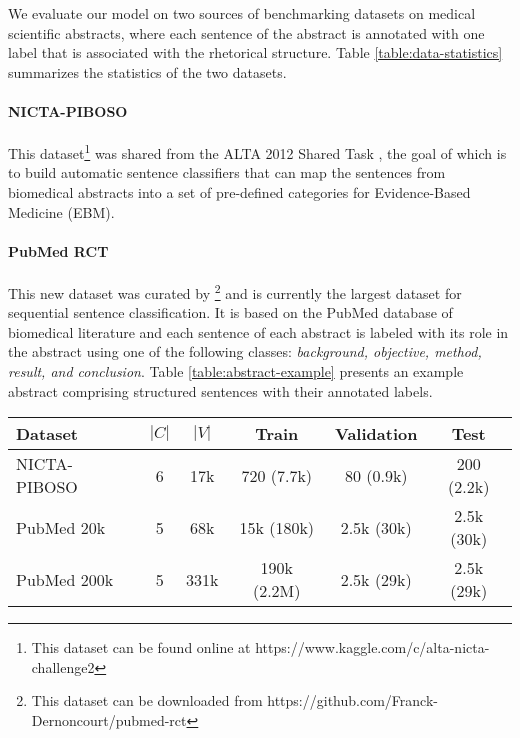 \documentclass[11pt,a4paper]{article}
\begin{document}
We evaluate our model on two sources of benchmarking datasets on medical scientific abstracts, where each sentence of the abstract is annotated with one label that is associated with the rhetorical structure. Table \ref{table:data-statistics} summarizes the statistics of the two datasets.


\paragraph{NICTA-PIBOSO}

This dataset\footnote{This dataset can be found online at https://www.kaggle.com/c/alta-nicta-challenge2} was shared from the ALTA 2012 Shared Task \cite{amini2012overview}, the goal of which is to build automatic sentence classifiers that can map the sentences from biomedical abstracts into a set of pre-defined categories for Evidence-Based Medicine (EBM).

\paragraph{PubMed RCT}

This new dataset was curated by \cite{dernoncourt2017pubmed}\footnote{This dataset can be downloaded from https://github.com/Franck-Dernoncourt/pubmed-rct} and is currently the largest dataset for sequential sentence classification. It is based on the PubMed database of biomedical literature and each sentence of each abstract is labeled with its role in the abstract using one of the following classes: \textit{background, objective, method, result, and conclusion}. Table \ref{table:abstract-example} presents an example abstract comprising structured sentences with their annotated labels. 


\begin{table*}[h!]
\centering
\begin{tabular}{|l|c|c|c|c|c|}
\hline
\textbf{Dataset} & \textbf{$|C|$} & \textbf{$|V|$} & Train & Validation & Test \\ \hline
NICTA-PIBOSO            & 6            & 17k          & 720 (7.7k)       & 80 (0.9k)           & 200 (2.2k)      \\ \hline
PubMed 20k       & 5            & 68k          & 15k (180k)     & 2.5k (30k)          & 2.5k (30k)    \\ \hline
PubMed 200k      & 5            & 331k         & 190k (2.2M)    & 2.5k (29k)          & 2.5k (29k)    \\ \hline
\end{tabular}
\caption{Datasets statistics. $|C|$ denotes the number of labels, $|V|$ represents the vocabulary size. For the train, validation, and test sets, we indicate the number of abstracts followed by the number of sentences in parentheses.}
\label{table:data-statistics}
\end{table*}
\end{document}
